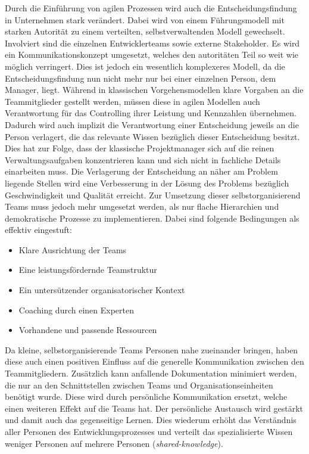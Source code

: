 Durch die Einführung von agilen Prozessen wird auch die Entscheidungsfindung in Unternehmen stark verändert.
Dabei wird von einem Führungsmodell mit starken Autorität zu einem verteilten, selbstverwaltenden Modell gewechselt.
Involviert sind die einzelnen Entwicklerteams sowie externe Stakeholder.
Es wird ein Kommunikationskonzept umgesetzt, welches den autoritäten Teil so weit wie möglich verringert.
Dies ist jedoch ein wesentlich komplexeres Modell, da die Entscheidungsfindung nun nicht mehr nur bei einer einzelnen Person, dem Manager, liegt.
Während in klassischen Vorgehensmodellen klare Vorgaben an die Teammitglieder gestellt werden, müssen diese in agilen Modellen auch Verantwortung für das Controlling ihrer Leistung und Kennzahlen übernehmen.
Dadurch wird auch implizit die Verantwortung einer Entscheidung jeweils an die Person verlagert, die das relevante Wissen bezüglich dieser Entscheidung besitzt.
Dies hat zur Folge, dass der klassische Projektmanager sich auf die reinen Verwaltungsaufgaben konzentrieren kann und sich nicht in fachliche Details einarbeiten muss.
Die Verlagerung der Entscheidung an näher am Problem liegende Stellen wird eine Verbesserung in der Lösung des Problems bezüglich Geschwindigkeit und Qualität erreicht.
Zur Umsetzung dieser selbstorganisierend Teams muss jedoch mehr umgesetzt werden, als nur flache Hierarchien und demokratische Prozesse zu implementieren.
Dabei sind folgende Bedingungen als effektiv eingestuft:
\begin{itemize}
\item Klare Ausrichtung der Teams
\item Eine leistungsfördernde Teamstruktur
\item Ein untersützender organisatorischer Kontext
\item Coaching durch einen Experten
\item Vorhandene und passende Ressourcen
\end{itemize}
\parencite[Vgl.][S. 863 f.]{Moe:2012aa}

Da kleine, selbstorganisierende Teams Personen nahe zueinander bringen, haben diese auch einen positiven Einfluss auf die generelle Kommunikation zwischen den Teammitgliedern.
Zusätzlich kann anfallende Dokumentation minimiert werden, die nur an den Schnittstellen zwischen Teams und Organisationseinheiten benötigt wurde.
Diese wird durch persönliche Kommunikation ersetzt, welche einen weiteren Effekt auf die Teams hat. 
Der persönliche Austausch wird gestärkt und damit auch das gegenseitige Lernen.
Dies wiederum erhöht das Verständnis aller Personen des Entwicklungsprozesses und verteilt das spezialisierte Wissen weniger Personen auf mehrere Personen (\emph{shared-knowledge}).
\parencite[Vgl.][S. 685]{Petersen:2010aa}

